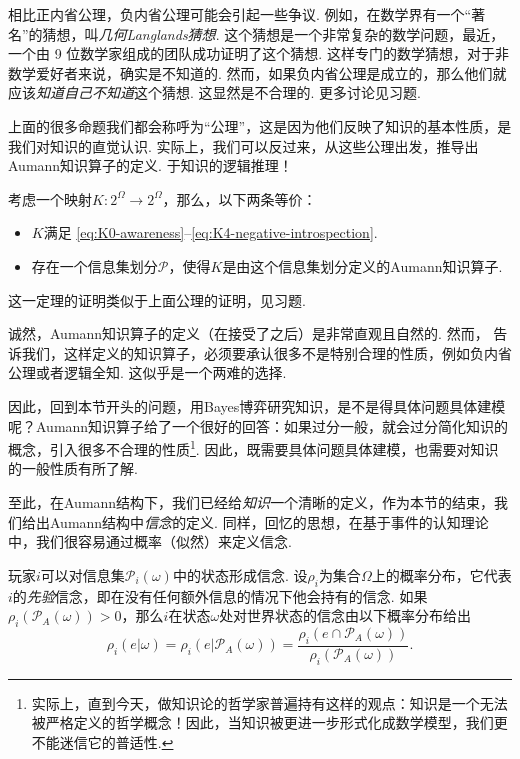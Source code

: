 相比正内省公理，负内省公理可能会引起一些争议. 例如，在数学界有一个“著名”的猜想，叫\textit{几何Langlands猜想}. 这个猜想是一个非常复杂的数学问题，最近，一个由 9 位数学家组成的团队成功证明了这个猜想. 这样专门的数学猜想，对于非数学爱好者来说，确实是不知道的. 然而，如果负内省公理是成立的，那么他们就应该\textit{知道自己不知道}这个猜想. 这显然是不合理的. 更多讨论见习题.

上面的很多命题我们都会称呼为“公理”，这是因为他们反映了知识的基本性质，是我们对知识的直觉认识. 实际上，我们可以反过来，从这些公理出发，推导出Aumann知识算子的定义. 
于知识的逻辑推理！

\begin{theorem}\label{thm:Aumann-operator-iff}
考虑一个映射$K:2^\Omega\to 2^\Omega$，那么，以下两条等价：
\begin{itemize}
    \item $K$满足 \eqref{eq:K0-awareness}--\eqref{eq:K4-negative-introspection}.
    \item 存在一个信息集划分$\mathcal P$，使得$K$是由这个信息集划分定义的Aumann知识算子.
\end{itemize}
\end{theorem}

这一定理的证明类似于上面公理的证明，见习题.

诚然，Aumann知识算子的定义（在接受了之后）是非常直观且自然的. 然而， 告诉我们，这样定义的知识算子，必须要承认很多不是特别合理的性质，例如负内省公理或者逻辑全知. 这似乎是一个两难的选择. 

因此，回到本节开头的问题，用Bayes博弈研究知识，是不是得具体问题具体建模呢？Aumann知识算子给了一个很好的回答：如果过分一般，就会过分简化知识的概念，引入很多不合理的性质\footnote{实际上，直到今天，做知识论的哲学家普遍持有这样的观点：知识是一个无法被严格定义的哲学概念！因此，当知识被更进一步形式化成数学模型，我们更不能迷信它的普适性.}. 因此，既需要具体问题具体建模，也需要对知识的一般性质有所了解.

至此，在Aumann结构下，我们已经给\textit{知识}一个清晰的定义，作为本节的结束，我们给出Aumann结构中\textit{信念}的定义. 同样，回忆的思想，在基于事件的认知理论中，我们很容易通过概率（似然）来定义信念. 

玩家$i$可以对信息集$\mathcal P_i(\omega)$中的状态形成信念. 设$\rho_i$为集合$\Omega$上的概率分布，它代表$i$的\textit{先验}信念，即在没有任何额外信息的情况下他会持有的信念. 如果$\rho_i(\mathcal P_A(\omega)) > 0$，那么$i$在状态$\omega$处对世界状态的信念由以下概率分布给出
\[\rho_i(e|\omega)=\rho_i(e|\mathcal P_A(\omega)) = \frac{\rho_i(e\cap\mathcal P_A(\omega))}{\rho_i(\mathcal P_A(\omega))}.\]

